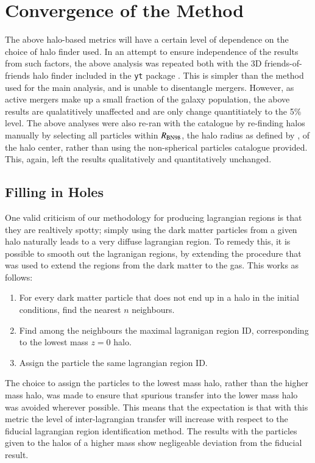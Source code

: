 \section{Convergence of the Method}
\label{sec:convergence}

The above halo-based metrics will have a certain level of dependence on the
choice of halo finder used. In an attempt to ensure independence of the results
from such factors, the above analysis was repeated both with the 3D
friends-of-friends halo finder included in the {\tt yt} package \citep{Turk2011}.
This is simpler than the \velociraptor{} method used for the main analysis, and
is unable to disentangle mergers. However, as active mergers make up a small
fraction of the galaxy population, the above results are qualatitively
unaffected and are only change quantitiately to the 5\% level. The above
analyses were also re-ran with the \velociraptor{} catalogue by re-finding
halos manually by selecting all particles within $R_{\rm BN98}$, the halo
radius as defined by \citet{Bryan1998}, of the halo center, rather than using
the non-spherical particles catalogue provided. This, again, left the results
qualitatively and quantitatively unchanged.


\subsection{Filling in Holes}


One valid criticism of our methodology for producing lagrangian regions is that
they are realtively spotty; simply using the dark matter particles from a given
halo naturally leads to a very diffuse lagrangian region. To remedy this, it is
possible to smooth out the lagranigan regions, by extending the procedure
that was used to extend the regions from the dark matter to the gas.
This works as follows:
\begin{enumerate}
	\item For every dark matter particle that does not end up in a halo 
	      in the initial conditions, find the nearest $n$ neighbours.
	\item Find among the neighbours the maximal lagranigan region ID,
	      corresponding to the lowest mass $z=0$ halo.
	\item Assign the particle the same lagrangian region ID.
\end{enumerate}
The choice to assign the particles to the lowest mass halo, rather than the
higher mass halo, was made to ensure that spurious transfer into the lower mass
halo was avoided wherever possible. This means that the expectation is that
with this metric the level of inter-lagrangian transfer will increase with
respect to the fiducial lagrangian region identification method. The results
with the particles given to the halos of a higher mass show negligeable
deviation from the fiducial result.

